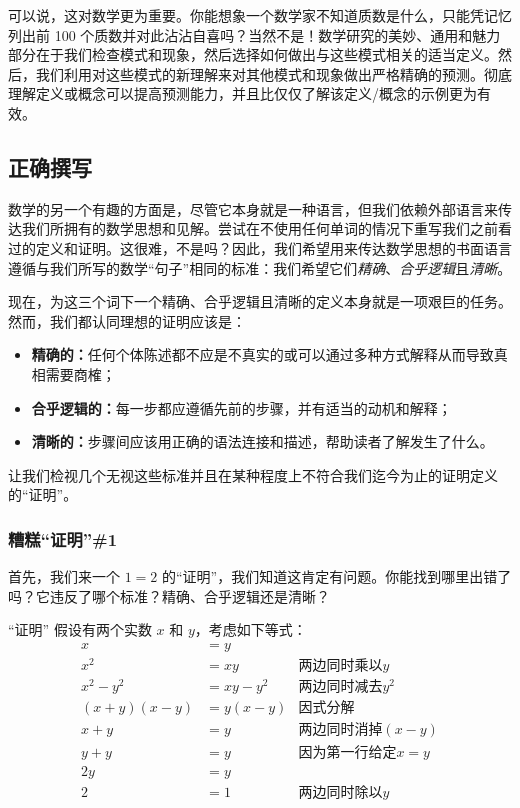 可以说，这对数学更为重要。你能想象一个数学家不知道质数是什么，只能凭记忆列出前 100 个质数并对此沾沾自喜吗？当然不是！数学研究的美妙、通用和魅力部分在于我们检查模式和现象，然后选择如何做出与这些模式相关的适当定义。然后，我们利用对这些模式的新理解来对其他模式和现象做出严格精确的预测。彻底理解定义或概念可以提高预测能力，并且比仅仅了解该定义/概念的示例更为有效。


\subsection{正确撰写}

数学的另一个有趣的方面是，尽管它本身就是一种语言，但我们依赖外部语言来传达我们所拥有的数学思想和见解。尝试在不使用任何单词的情况下重写我们之前看过的定义和证明。这很难，不是吗？因此，我们希望用来传达数学思想的书面语言遵循与我们所写的数学``句子''相同的标准：我们希望它们\emph{精确}、\emph{合乎逻辑}且\emph{清晰}。

现在，为这三个词下一个精确、合乎逻辑且清晰的定义本身就是一项艰巨的任务。然而，我们都认同理想的证明应该是：

\begin{itemize}
    \item \textbf{精确的：}任何个体陈述都不应是不真实的或可以通过多种方式解释从而导致真相需要商榷；
    \item \textbf{合乎逻辑的：}每一步都应遵循先前的步骤，并有适当的动机和解释；
    \item \textbf{清晰的：}步骤间应该用正确的语法连接和描述，帮助读者了解发生了什么。
\end{itemize}

让我们检视几个无视这些标准并且在某种程度上不符合我们迄今为止的证明定义的``证明''。

\subsubsection*{糟糕``证明''\#1}

首先，我们来一个 $1=2$ 的``证明''，我们知道这肯定有问题。你能找到哪里出错了吗？它违反了哪个标准？精确、合乎逻辑还是清晰？

\begin{proofs}{``证明''}
    假设有两个实数 $x$ 和 $y$，考虑如下等式：
    \begin{align*}
        x &= y \\
        x^2 &= xy &\text{两边同时乘以} y\\
        x^2-y^2 &= xy-y^2 &\text{两边同时减去} y^2\\
        (x+y)(x-y) &= y(x-y) &\text{因式分解} \\
        x + y &= y &\text{两边同时消掉} (x-y)\\
        y + y &= y &\text{因为第一行给定} x=y\\ 
        2y &= y \\
        2 &= 1 &\text{两边同时除以} y
    \end{align*}
\end{proofs}

